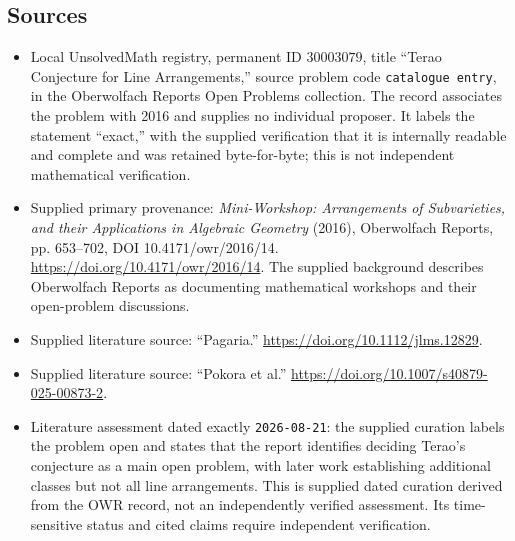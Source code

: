 \documentclass[11pt]{article}
\begin{document}
\subsection{Sources}
\begin{itemize}
\item Local UnsolvedMath registry, permanent ID \(30003079\), title ``Terao Conjecture for Line Arrangements,'' source problem code \texttt{catalogue entry}, in the Oberwolfach Reports Open Problems collection. The record associates the problem with 2016 and supplies no individual proposer. It labels the statement ``exact,'' with the supplied verification that it is internally readable and complete and was retained byte-for-byte; this is not independent mathematical verification.
\item Supplied primary provenance: \emph{Mini-Workshop: Arrangements of Subvarieties, and their Applications in Algebraic Geometry} (2016), Oberwolfach Reports, pp. 653--702, DOI 10.4171/owr/2016/14. \url{https://doi.org/10.4171/owr/2016/14}. The supplied background describes Oberwolfach Reports as documenting mathematical workshops and their open-problem discussions.
\item Supplied literature source: ``Pagaria.'' \url{https://doi.org/10.1112/jlms.12829}.
\item Supplied literature source: ``Pokora et al.'' \url{https://doi.org/10.1007/s40879-025-00873-2}.
\item Literature assessment dated exactly \texttt{2026-08-21}: the supplied curation labels the problem open and states that the report identifies deciding Terao's conjecture as a main open problem, with later work establishing additional classes but not all line arrangements. This is supplied dated curation derived from the OWR record, not an independently verified assessment. Its time-sensitive status and cited claims require independent verification.
\end{itemize}
\end{document}

